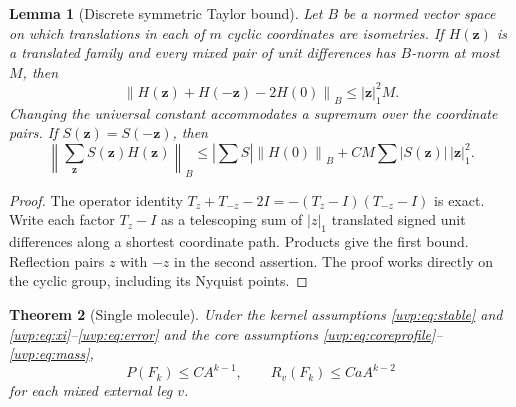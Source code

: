 \documentclass[11pt]{article}
\numberwithin{equation}{section}
\newtheorem{theorem}{Theorem}[section]
\newtheorem{lemma}[theorem]{Lemma}
\theoremstyle{remark}
\newcommand{\norm}[1]{\left\|#1\right\|}
\begin{document}
\begin{lemma}[Discrete symmetric Taylor bound]\label{uvp:lem:taylor}
Let $B$ be a normed vector space on which translations in each of
$m$ cyclic coordinates are isometries. If $H(\boldsymbol z)$ is a
translated family and every mixed pair of unit differences has
$B$-norm at most $M$, then
\[
 \norm{H(\boldsymbol z)+H(-\boldsymbol z)-2H(0)}_B
      \le |\boldsymbol z|_1^2 M.
\]
Changing the universal constant accommodates a supremum over the
coordinate pairs. If $S(\boldsymbol z)=S(-\boldsymbol z)$, then
\[
 \norm{\sum_{\boldsymbol z}S(\boldsymbol z)H(\boldsymbol z)}_B
 \le \left|\sum S\right|\norm{H(0)}_B
      +C M\sum |S(\boldsymbol z)|\,|\boldsymbol z|_1^2.
\]
\end{lemma}
\begin{proof}
The operator identity
$T_z+T_{-z}-2I=-(T_z-I)(T_{-z}-I)$ is exact. Write each factor
$T_z-I$ as a telescoping sum of $|z|_1$ translated signed unit
differences along a shortest coordinate path. Products give the first
bound. Reflection pairs $z$ with $-z$ in the second assertion. The
proof works directly on the cyclic group, including its Nyquist points.
\end{proof}

\begin{theorem}[Single molecule]\label{uvp:thm:molecule}
Under the kernel assumptions \eqref{uvp:eq:stable} and \eqref{uvp:eq:xi}--\eqref{uvp:eq:error}
and the core assumptions \eqref{uvp:eq:coreprofile}--\eqref{uvp:eq:mass},
\[
 P(F_k)\le C A^{k-1},\qquad
 R_v(F_k)\le C a A^{k-2}
\]
for each mixed external leg $v$.
\end{theorem}
\end{document}
